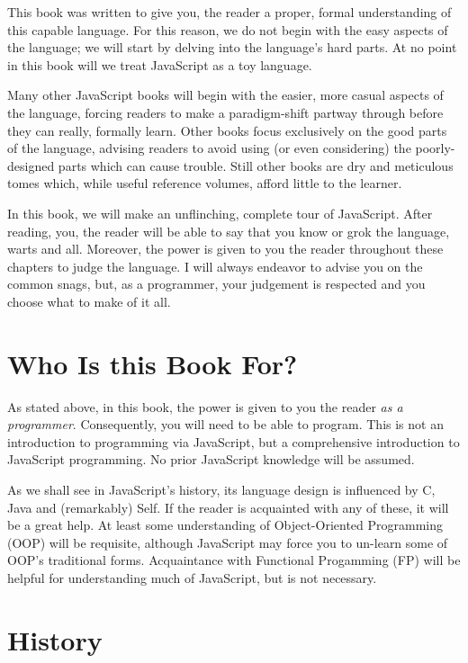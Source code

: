 \documentclass[11pt,letter]{book}
\begin{document}
    This book was written to give you, the reader a proper, formal understanding of this capable 
    language. For this reason, we do not begin with the easy aspects of the language; we will start 
    by delving into the language's hard parts. At no point in this book will we treat JavaScript as
    a toy language. 
    
    Many other JavaScript books will begin with the easier, more casual aspects of the language, 
    forcing readers to make a paradigm-shift partway through before they can really, formally learn.
    Other books focus exclusively on the good parts of the language, advising readers to avoid using 
    (or even considering) the poorly-designed parts which can cause trouble. Still other books are 
    dry and meticulous tomes which, while useful reference volumes, afford little to the learner.
    
    In this book, we will make an unflinching, complete tour of JavaScript. After reading, you, the 
    reader will be able to say that you know or grok the language, warts and all. Moreover, 
    the power is given to you the reader throughout these chapters to judge the language. I will 
    always endeavor to advise you on the common snags, but, as a programmer, your judgement is 
    respected and you choose what to make of it all.
    
    \section*{Who Is this Book For?}
    As stated above, in this book, the power is given to you the reader \emph{as a programmer}. 
    Consequently, you will need to be able to program. This is not an introduction to programming 
    via JavaScript, but a comprehensive introduction to JavaScript programming. No prior 
    JavaScript knowledge will be assumed.
    
    As we shall see in JavaScript's history, its language design is influenced by C, Java and 
    (remarkably) Self. If the reader is acquainted with any of these, it will be a great help. At 
    least some understanding of Object-Oriented Programming (OOP) will be requisite, although 
    JavaScript may force you to un-learn some of OOP's traditional forms. Acquaintance with 
    Functional Progamming (FP) will be helpful for understanding much of JavaScript, but is not 
    necessary.
    
    \section*{History}
    
\end{document}
